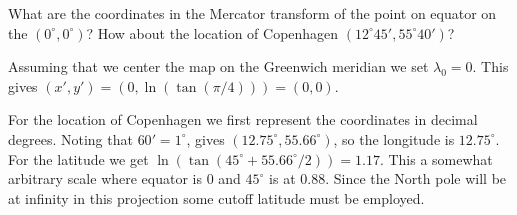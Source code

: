 
\myhrule
\begin{myex}
What are the coordinates in the Mercator transform of the point on equator on the 
 $(0^\circ,0^\circ)$? How about the location of Copenhagen $(12^\circ45',55^\circ40')$?

\vspace{0.5cm}
Assuming that we center the map on the Greenwich meridian we set  $\lambda_0=0$. This gives
$(x',y') = (0, \ln(\tan(\pi/4))) = (0,0)$.

\vspace{0.5cm}
For the location of Copenhagen we first represent the coordinates in decimal degrees. Noting that $60'=1^\circ$, 
gives $(12.75^\circ, 55.66^\circ)$, so the longitude is $12.75^\circ$. For the latitude we get $\ln(\tan(45^\circ+55.66^\circ/2))=
1.17$. This a somewhat arbitrary scale where equator is 0 and $45^\circ$ is at $0.88$. Since the North pole will 
be at infinity in this projection some cutoff latitude must be employed. 

\end{myex}
